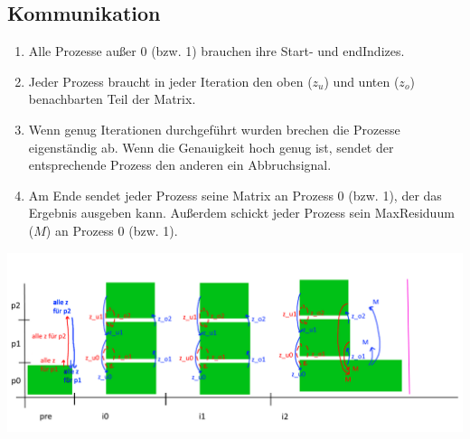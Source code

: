 \documentclass[a4paper,10pt]{article}
\begin{document}
\subsection*{Kommunikation}
\begin{enumerate}
 \item Alle Prozesse außer 0 (bzw. 1) brauchen ihre Start- und endIndizes.
 \item Jeder Prozess braucht in jeder Iteration den oben ($z_{u}$) und unten ($z_o$) benachbarten Teil der Matrix.
 \item Wenn genug Iterationen durchgeführt wurden brechen die Prozesse eigenständig ab. Wenn die Genauigkeit hoch genug ist, sendet der entsprechende Prozess den anderen ein Abbruchsignal.
 \item Am Ende sendet jeder Prozess seine Matrix an Prozess 0 (bzw. 1), der das Ergebnis ausgeben kann. Außerdem schickt jeder Prozess sein MaxResiduum ($M$) an Prozess 0 (bzw. 1).
\end{enumerate}
\includegraphics[width=14cm]{Comms.png}
\end{document}
